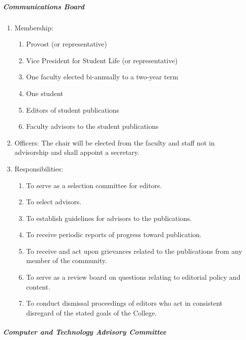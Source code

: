 \documentclass[letterpaper, 11pt]{article}
\begin{document}
				\subparagraph{Communications Board}
					\begin{enumerate}[label=\alph*)]
						\item{Membership:
							\begin{enumerate}[label=\arabic*)]
								\item{Provost (or representative)}
								\item{Vice President for Student Life (or representative)}
								\item{One faculty elected bi-annually to a two-year term}
								\item{One student}
								\item{Editors of student publications}
								\item{Faculty advisors to the student publications}
							\end{enumerate}
						}
						\item{Officers:
							The chair will be elected from the faculty and staff not in advisorship and shall appoint a secretary.
						}
						\item{Responsibilities:
							\begin{enumerate}[label=\arabic*)]
								\item{To serve as a selection committee for editors.}
								\item{To select advisors.}
								\item{To establish guidelines for advisors to the publications.}
								\item{To receive periodic reports of progress toward publication.}
								\item{To receive and act upon grievances related to the publications from any member of the community.}
								\item{To serve as a review board on questions relating to editorial policy and content.}
								\item{To conduct dismissal proceedings of editors who act in consistent disregard of the stated goals of the College.}
							\end{enumerate}
						}
					\end{enumerate}
				\subparagraph{Computer and Technology Advisory Committee}
\end{document}
